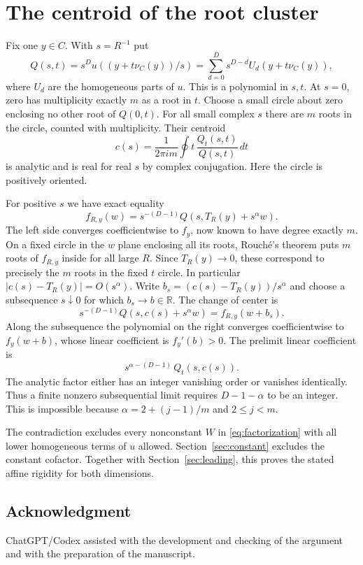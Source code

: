 \documentclass[11pt]{amsart}
\begin{document}
\section{The centroid of the root cluster}\label{sec:cluster}

Fix one \(y\in C\). With \(s=R^{-1}\) put
\[
 Q(s,t)=s^D u((y+t\nu_C(y))/s)
       =\sum_{d=0}^D s^{D-d} U_d(y+t\nu_C(y)),
\]
where \(U_d\) are the homogeneous parts of \(u\).
This is a polynomial in \(s,t\). At \(s=0\), zero has
multiplicity exactly \(m\) as a root in \(t\). Choose a
small circle about zero enclosing no other root of \(Q(0,t)\).
For all small complex \(s\) there are \(m\) roots in the
circle, counted with multiplicity. Their centroid
\[
 c(s)=\frac{1}{2\pi i m}\oint t\,\frac{Q_t(s,t)}{Q(s,t)}\,dt
\]
is analytic and is real for real \(s\) by complex conjugation.
Here the circle is positively oriented.

For positive \(s\) we have exact equality
\[
 f_{R,y}(w)=s^{-(D-1)}Q(s,T_R(y)+s^\alpha w).
\]
The left side converges coefficientwise to \(f_y\), now
known to have degree exactly \(m\). On a fixed circle in
the \(w\) plane enclosing all its roots, Rouch\'e's theorem
puts \(m\) roots of \(f_{R,y}\) inside for all large \(R\).
Since \(T_R(y)\to0\), these correspond to precisely the
\(m\) roots in the fixed \(t\) circle. In particular
\(|c(s)-T_R(y)|=O(s^\alpha)\). Write \(b_s=(c(s)-T_R(y))/s^\alpha\)
and choose a subsequence \(s\downarrow0\) for which \(b_s\to b\in\mathbb R\).
The change of center is
\[
 s^{-(D-1)}Q(s,c(s)+s^\alpha w)=f_{R,y}(w+b_s).
\]
Along the subsequence the polynomial on the right converges coefficientwise
to \(f_y(w+b)\), whose linear coefficient is \(f_y'(b)>0\).
The prelimit linear coefficient is
\[
 s^{\alpha-(D-1)}\,Q_t(s,c(s)).
\]
The analytic factor either has an integer vanishing order or vanishes
identically. Thus a finite nonzero subsequential
limit requires \(D-1-\alpha\) to be an integer. This is
impossible because \(\alpha=2+(j-1)/m\) and \(2\le j<m\).

The contradiction excludes every nonconstant \(W\) in \eqref{eq:factorization}
with all lower homogeneous terms of \(u\) allowed. Section~\ref{sec:constant}
excludes the constant cofactor. Together with Section~\ref{sec:leading},
this proves the stated affine rigidity for both dimensions.

\subsection*{Acknowledgment}
ChatGPT/Codex assisted with the development and checking of the argument and with the preparation of the manuscript.
\end{document}
